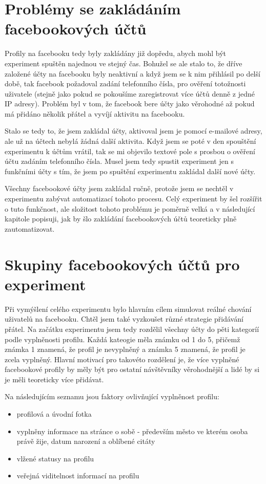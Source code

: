 \documentclass[thesis=M,czech]{FITthesis}[2013/05/10]
\begin{document}
\section{Problémy se zakládáním facebookových účtů}

Profily na facebooku tedy byly zakládány již dopředu, abych mohl být experiment spuštěn najednou ve stejný čas. Bohužel se ale stalo to, že dříve založené účty na facebooku byly neaktivní a když jsem se k nim přihlásil po delší době, tak facebook požadoval zadání telefonního čísla, pro ověření totožnosti uživatele (stejně jako pokud se pokoušíme zaregistrovat více účtů denně z jedné IP adresy). Problém byl v tom, že facebook bere účty jako věrohodné až pokud má přidáno několik přátel a vyvíjí aktivitu na facebooku. 

Stalo se tedy to, že jsem zakládal účty, aktivoval jsem je pomocí e-mailové adresy, ale už na účtech nebylá žádná další aktivita. Když jsem se poté v den spouštění experimentu k účtům vrátil, tak se mi objevilo textové pole s prosbou o ověření účtu zadáním telefonního čísla. Musel jsem tedy spustit experiment jen s funkčními účty s tím, že jsem po spuštění experimentu zakládal další nové účty.

Všechny facebookové účty jsem zakládal ručně, protože jsem se nechtěl v experimentu zabývat automatizací tohoto procesu. Celý experiment by šel rozšířit o tuto funkčnost, ale složitost tohoto problému je poměrně velká a v následující kapitole popisuji, jak by šlo zakládání facebookových účtů teoreticky plně zautomatizovat.

\section{Skupiny facebookových účtů pro experiment}

Při vymýšlení celého experimentu bylo hlavním cílem simulovat reálné chování uživatelů na facebooku. Chtěl jsem také vyzkoušet různé strategie přidávání přátel. Na začátku experimentu jsem tedy rozdělil všechny účty do pěti kategoríí podle vyplněnosti profilu. Každá kateogie měla známku od 1 do 5, přičemž známka 1 znamená, že profil je nevyplněný a známka 5 znamená, že profil je zcela vyplněný. Hlavní motivací pro takovéto rozdělení je, že více vyplněné facebookové profily by měly být pro ostatní návštěvníky věrohodnější a lidé by si je měli teoreticky více přidávat.

Na následujícím seznamu jsou faktory ovlivňující vyplněnost profilu:

\begin{itemize}
  \item profilová a úvodní fotka
  \item vyplněny informace na stránce o sobě - především město ve kterém osoba právě žije, datum narození a oblíbené citáty
  \item vlžené statusy na profilu
  \item veřejná viditelnost informací na profilu
\end{itemize}
\end{document}
